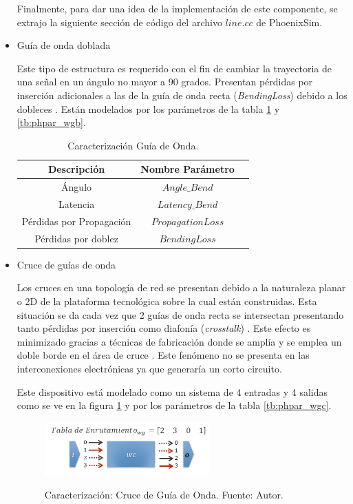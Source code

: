 \begin{itemize}
Finalmente, para dar una idea de la implementación de este componente, se extrajo la siguiente
sección de código del archivo $line.cc$ de PhoenixSim.



\item Guía de onda doblada

Este tipo de estructura es requerido con el fin de cambiar la trayectoria de una señal en
un ángulo no mayor a 90 grados. Presentan pérdidas por inserción adicionales a las de 
la guía de onda recta (\textit{BendingLoss}) debido a 
los dobleces \cite{Chan2011}. Están modelados por los parámetros de la tabla \ref{tb:wgb_params} 
y \ref{tb:phpar_wgb}.

\begin{table}[H]
\centering
\begin{tabular}{|c|c|c|}
\hline
Descripción &  Nombre Parámetro \\
\hline
Ángulo & $Angle\_Bend$ \\
Latencia & $Latency\_Bend$ \\
Pérdidas por Propagación & $PropagationLoss$ \\
Pérdidas por doblez & $BendingLoss$ \\
\hline
\end{tabular}
\caption{Caracterización Guía de Onda.}
\label{tb:wgb_params}
\end{table} 


\item Cruce de guías de onda

Los cruces en una topología de red se presentan debido a la naturaleza planar o 2D 
de la plataforma tecnológica sobre la cual están construidas. Esta situación se da cada vez que 
2 guías de onda recta se intersectan presentando tanto pérdidas por inserción como diafonía 
(\textit{crosstalk}) \cite{Chan2010}. Este efecto es minimizado gracias a técnicas de fabricación donde 
se amplía y se emplea un doble borde en el área de cruce \cite{bogaerts2007low}.
Este fenómeno no se presenta en las interconexiones electrónicas ya que generaría un corto
circuito. 

Este dispositivo está modelado como un sistema de 4 entradas y 4 salidas como se ve en la 
figura \ref{fig:phoenix_wgc} y por los parámetros de la tabla \ref{tb:phpar_wgc}.
\begin{figure}[H]
\caption{Caracterización: Cruce de Guía de Onda. Fuente: Autor.}
\centering
\includegraphics[width=0.6\textwidth,natwidth=430,natheight=139]{figs/wgcross.png}
\label{fig:phoenix_wgc}
\end{figure}


\end{itemize}

